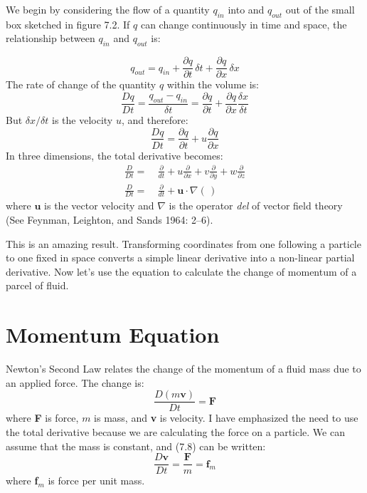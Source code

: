 We begin by considering the flow of a quantity  $q_{in}$ into and $q_{out}$ out
of the small box sketched in figure 7.2. If $q$ can change continuously in time
and space, the relationship between $q_{in}$ and $q_{out}$ is:

\begin{equation}
q_{out} = q_{in} + \frac{\partial{q}}{\partial{t}}\,\delta{t} + \frac{\partial{q}}{\partial{x}}\,\delta{x}
\end{equation}
The rate of change of the quantity $q$ within the volume is:
\begin{equation}
\frac{Dq}{Dt} = \frac{q_{out} - q_{in}}{\delta{t}}=
\frac{\partial{q}}{\partial{t}} +
\frac{\partial{q}}{\partial{x}}\frac{\delta{x}}{\delta{t}}
\end{equation}
But $\delta x /\delta t$ is the velocity $u$, and therefore:
\begin{displaymath}
\frac{Dq}{Dt} = \frac{\partial{q}}{\partial{t}} +
u\frac{\partial{q}}{\partial{x}}
\end{displaymath}
In three dimensions, the total derivative becomes:
\begin{subequations}
\begin{align}
\frac{D}{Dt} = & \:\frac{\partial}{dt} + u\frac{\partial}{\partial{x}} + v\frac{\partial}{\partial y} + w\frac{\partial
}{\partial z}
\\
\frac{D}{Dt} = & \:\frac{\partial}{dt} +
\mathbf{u}\cdot \nabla(\,)
\end{align}
\end{subequations}
where $\mathbf{u}$ is the vector velocity and $\nabla$ is the
operator \textit{del} of vector field theory (See Feynman, Leighton, and Sands
1964: 2--6).

This is an amazing result. Transforming coordinates from one
following a particle to one fixed in space converts a simple linear derivative
into a non-linear partial derivative. Now let's use the equation to calculate the
change of momentum of a parcel of fluid.

\section{Momentum Equation}
Newton's Second Law relates the change of
the momentum of a fluid mass due to an applied force. The change
is:
\begin{equation}
\frac{D(m\textbf{v})}{Dt} = \textbf{F}
\end{equation}
where \textbf{F} is force, $m$ is mass, and \textbf{v} is velocity. I have emphasized the need to use the total derivative because we are calculating the force on a particle. We can assume that the mass is constant, and (7.8) can be written:
\begin{equation}
\frac{D\textbf{v}}{Dt} = \frac{\textbf{F}}{m} = \textbf{f$_m$}
\end{equation}
where \textbf{f$_m$} is force per unit mass.

